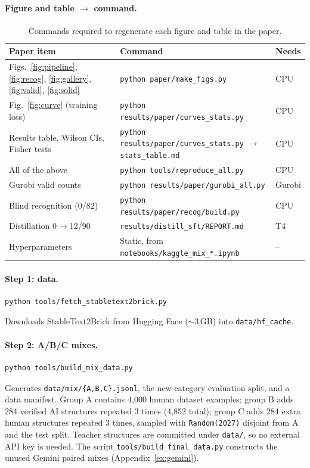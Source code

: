 \documentclass{article}
\begin{document}
\paragraph{Figure and table $\to$ command.}
\begin{table}[h]
\centering\small
\caption{Commands required to regenerate each figure and table in the paper.}
\label{tab:repro}
\begin{tabularx}{\linewidth}{@{}>{\raggedright\arraybackslash}p{3.7cm}>{\raggedright\arraybackslash}X l@{}}
\toprule
Paper item & Command & Needs \\
\midrule
Figs.~\ref{fig:pipeline}, \ref{fig:recog}, \ref{fig:gallery}, \ref{fig:valid}, \ref{fig:solid} & \texttt{python paper/make\_figs.py} & CPU \\
Fig.~\ref{fig:curve} (training loss) & \texttt{python results/paper/curves\_stats.py} & CPU \\
Results table, Wilson CIs, Fisher tests & \texttt{python results/paper/curves\_stats.py} $\to$ \texttt{stats\_table.md} & CPU \\
All of the above & \texttt{python tools/reproduce\_all.py} & CPU \\
Gurobi valid counts & \texttt{python results/paper/gurobi\_all.py} & Gurobi \\
Blind recognition (0/82) & \texttt{python results/paper/recog/build.py} & CPU \\
Distillation 0$\to$12/90 & \texttt{results/distill\_sft/REPORT.md} & T4 \\
Hyperparameters & Static, from \texttt{notebooks/kaggle\_mix\_*.ipynb} & -- \\
\bottomrule
\end{tabularx}
\end{table}

\paragraph{Step 1: data.}
{\small
\begin{verbatim}
python tools/fetch_stabletext2brick.py
\end{verbatim}}
\noindent Downloads StableText2Brick from Hugging Face ($\sim$3\,GB) into \texttt{data/hf\_cache}.

\paragraph{Step 2: A/B/C mixes.}
{\small
\begin{verbatim}
python tools/build_mix_data.py
\end{verbatim}}
\noindent Generates \texttt{data/mix/\{A,B,C\}.jsonl}, the new-category evaluation split, and a data manifest. Group A contains 4{,}000 human dataset examples; group B adds 284 verified AI structures repeated 3 times (4{,}852 total); group C adds 284 extra human structures repeated 3 times, sampled with \texttt{Random(2027)} disjoint from A and the test split. Teacher structures are committed under \texttt{data/}, so no external API key is needed. The script \texttt{tools/build\_final\_data.py} constructs the unused Gemini paired mixes (Appendix~\ref{ex:gemini}).
\end{document}
